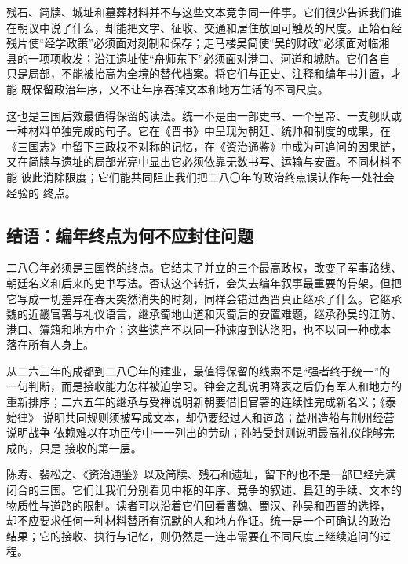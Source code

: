 残石、简牍、城址和墓葬材料并不与这些文本竞争同一件事。它们很少告诉我们谁
在朝议中说了什么，却能把文字、征收、交通和居住放回可触及的尺度。正始石经
残片使“经学政策”必须面对刻制和保存；走马楼吴简使“吴的财政”必须面对临湘
县的一项项收发；沿江遗址使“舟师东下”必须面对港口、河道和城防。它们各自
只是局部，不能被抬高为全境的替代档案。将它们与正史、注释和编年书并置，才能
既保留政治年序，又不让年序吞掉文本和地方生活的不同尺度。

这也是三国后效最值得保留的读法。统一不是由一部史书、一个皇帝、一支舰队或
一种材料单独完成的句子。它在《晋书》中呈现为朝廷、统帅和制度的成果，在
《三国志》中留下三政权不对称的记忆，在《资治通鉴》中成为可追问的因果链，
又在简牍与遗址的局部光亮中显出它必须依靠无数书写、运输与安置。不同材料不能
彼此消除限度；它们能共同阻止我们把二八〇年的政治终点误认作每一处社会经验的
终点。

\subsection{结语：编年终点为何不应封住问题}

二八〇年必须是三国卷的终点。它结束了并立的三个最高政权，改变了军事路线、
朝廷名义和后来的史书写法。否认这个转折，会失去编年叙事最重要的骨架。但把
它写成一切差异在春天突然消失的时刻，同样会错过西晋真正继承了什么。它继承
魏的近畿官署与礼仪语言，继承蜀地山道和灭蜀后的安置难题，继承孙吴的江防、
港口、簿籍和地方中介；这些遗产不以同一种速度到达洛阳，也不以同一种成本
落在所有人身上。

从二六三年的成都到二八〇年的建业，最值得保留的线索不是“强者终于统一”的
一句判断，而是接收能力怎样被迫学习。钟会之乱说明降表之后仍有军人和地方的
重新排序；二六五年的继承与受禅说明新朝要借旧官署的连续性完成新名义；《泰始律》
说明共同规则须被写成文本，却仍要经过人和道路；益州造船与荆州经营说明战争
依赖难以在功臣传中一一列出的劳动；孙皓受封则说明最高礼仪能够完成的，只是
接收的第一层。

陈寿、裴松之、《资治通鉴》以及简牍、残石和遗址，留下的也不是一部已经完满
闭合的三国。它们让我们分别看见中枢的年序、竞争的叙述、县廷的手续、文本的
物质性与道路的限制。读者可以沿着它们回看曹魏、蜀汉、孙吴和西晋的选择，
却不应要求任何一种材料替所有沉默的人和地方作证。统一是一个可确认的政治
结果；它的接收、执行与记忆，则仍然是一连串需要在不同尺度上继续追问的过程。
